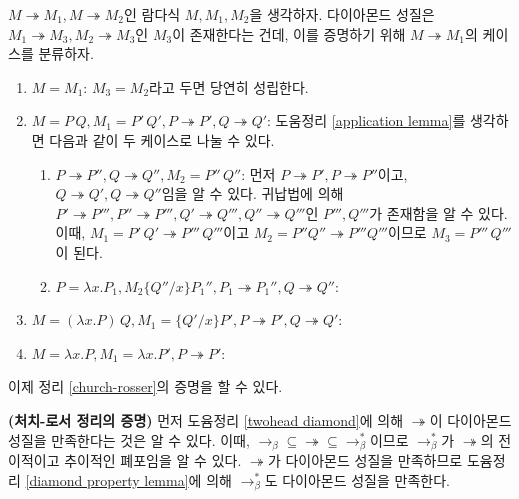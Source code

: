 \documentclass[b5paper, 11pt]{book}
\theoremstyle{definition}
\newenvironment{pf*}{\pushQED{\qed}\pf}
{\popQED\endpf}
\begin{document}
\begin{pf*}
    $M \twoheadrightarrow M_1, M \twoheadrightarrow M_2$인 람다식 $M, M_1, M_2$을 생각하자.
    다이아몬드 성질은 $M_1 \twoheadrightarrow M_3, M_2 \twoheadrightarrow M_3$인 $M_3$이
    존재한다는 건데, 이를 증명하기 위해 $M \twoheadrightarrow M_1$의 케이스를 분류하자.
    \begin{enumerate}
        \item $M = M_1$:
        $M_3 = M_2$라고 두면 당연히 성립한다.
        \item $M = P\, Q, M_1 = P' \, Q', P\twoheadrightarrow P', Q \twoheadrightarrow Q'$:
        도움정리 \ref{application lemma}를 생각하면 다음과 같이 두 케이스로 나눌 수 있다.
        \begin{enumerate}
            \item $P \twoheadrightarrow P'', Q \twoheadrightarrow Q'', 
             M_2 = P'' \, Q''$: 먼저 $P \twoheadrightarrow P', P \twoheadrightarrow P''$이고,
             $Q \twoheadrightarrow Q', Q \twoheadrightarrow Q''$임을 알 수 있다. 귀납법에 의해 
             $P' \twoheadrightarrow P''', P'' \twoheadrightarrow P''', Q' \twoheadrightarrow Q''',
             Q'' \twoheadrightarrow Q'''$인 $P''', Q'''$가 존재함을 알 수 있다. 이때, 
             $M_1 = P' \, Q' \twoheadrightarrow P''' \, Q'''$이고 $M_2 = P'' Q'' \twoheadrightarrow P''' Q'''$이므로
             $M_3 = P''' \, Q'''$이 된다.
             \item $P = \lambda x. P_1, M_2 \{Q'' / x\} P_1'' , P_1 \twoheadrightarrow P_1'', 
             Q \twoheadrightarrow Q''$: 
        \end{enumerate}
        \item $M = (\lambda x. P) \, Q, M_1 = \{Q' / x \}P', P \twoheadrightarrow P', Q \twoheadrightarrow Q'$:
        \item $M = \lambda x. P, M_1 = \lambda x .P', P \twoheadrightarrow P'$:
    \end{enumerate}
\end{pf*}
이제 정리 \ref{church-rosser}의 증명을 할 수 있다. 
\begin{pf*} 
    \textbf{(처치-로서 정리의 증명)} 먼저 도윰정리 \ref{twohead diamond}에 의해 $\twoheadrightarrow$이
    다이아몬드 성질을 만족한다는 것은 알 수 있다. 이때, $\rightarrow_\beta \subseteq \twoheadrightarrow
    \subseteq \rightarrow_\beta^*$이므로 $\rightarrow_\beta^*$가 $\twoheadrightarrow$의 전이적이고
    추이적인 폐포임을 알 수 있다. $\twoheadrightarrow$가 다이아몬드 성질을 만족하므로 도윰정리 
    \ref{diamond property lemma}에 의해 $\rightarrow_\beta^*$도 다이아몬드 성질을 만족한다.
\end{pf*}
\end{document}
